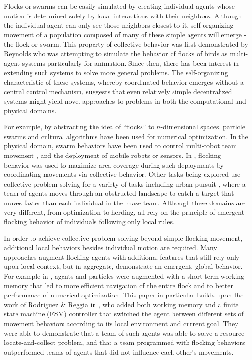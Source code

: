 \documentclass[conference,final]{IEEEtran}
\begin{document}
Flocks or swarms can be easily simulated by creating individual agents whose motion is determined solely by local interactions with their neighbors. Although the individual agent can only see those neighbors closest to it, self-organizing movement of a population composed of many of these simple agents will emerge - the flock or swarm. This property of collective behavior was first demonstrated by Reynolds \cite{reynolds1987flocks} who was attempting to simulate the behavior of flocks of birds as multi-agent systems particularly for animation. Since then, there has been interest in extending such systems to solve more general problems. The self-organizing characteristic of these systems, whereby coordinated behavior emerges without a central control mechanism, suggests that even relatively simple decentralized systems might yield novel approaches to problems in both the computational and physical domains.

For example, by abstracting the idea of ``flocks'' to $n$-dimensional spaces, particle swarms \cite{kennedy1995particle,clerc2002particle} and cultural algorithms \cite{chung1996testbed} have been used for numerical optimization. In the physical domain, swarm behaviors have been used to control multi-robot team movement \cite{balch1998behavior,ccelikkanat2010steering,hodgins1994robot}, and the deployment of mobile robots or sensors. In \cite{cheng2009distributed}, flocking behavior was used to maximize area coverage during such deployments by coordinating movements via collective behavior. Other tasks being explored use collective problem solving for a variety of tasks including urban pursuit \cite{winder2004using}, where a team of agents moves through an obstructed landscape to catch a target that moves faster than each individual in the chase team. Although these domains are very different, from optimization to herding, all rely on the principle of emergent flocking behavior of individuals following only local rules.

In order to achieve collective problem solving beyond simple flocking movement, additional local behaviors besides individual motion are required. Many approaches augment flocking agents with additional features that still rely only upon local context, but in aggregate, demonstrate an emergent, global behavior. For example in \cite{winder2012role,hu2003particle}, agents and particles were augmented with a short-term working memory that led to more efficient navigation of the entire flock and to better performance of numerical optimization. This paper in particular builds upon the work of Rodriguez \& Reggia in \cite{rodriguez2004extending}, who added both working memory and a finite state machine (FSM) controller that switched the agent between different sets of movement behaviors according to its local environment and current goal. They were able to demonstrate that a team of such agents was able to solve a resource locate-and-collect problem, and that a team programmed with flocking behaviors outperformed teams of agents that did not influence each other's movements.
\end{document}
